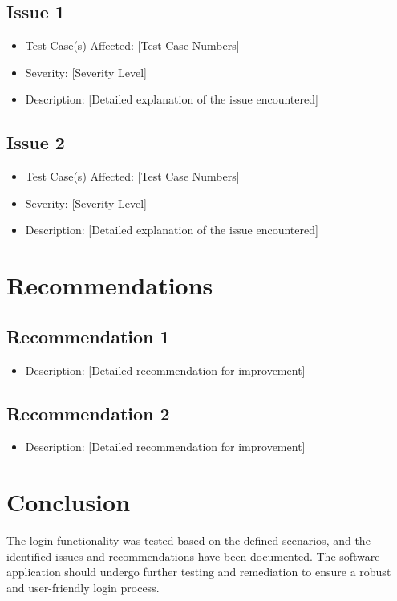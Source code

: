 \documentclass{article}
\begin{document}
\subsection{Issue 1}
\begin{itemize}
  \item Test Case(s) Affected: [Test Case Numbers]
  \item Severity: [Severity Level]
  \item Description: [Detailed explanation of the issue encountered]
\end{itemize}

\subsection{Issue 2}
\begin{itemize}
  \item Test Case(s) Affected: [Test Case Numbers]
  \item Severity: [Severity Level]
  \item Description: [Detailed explanation of the issue encountered]
\end{itemize}

\section{Recommendations}

\subsection{Recommendation 1}
\begin{itemize}
  \item Description: [Detailed recommendation for improvement]
\end{itemize}

\subsection{Recommendation 2}
\begin{itemize}
  \item Description: [Detailed recommendation for improvement]
\end{itemize}

\section{Conclusion}
The login functionality was tested based on the defined scenarios, and the identified issues and recommendations have been documented. The software application should undergo further testing and remediation to ensure a robust and user-friendly login process.
\end{document}
